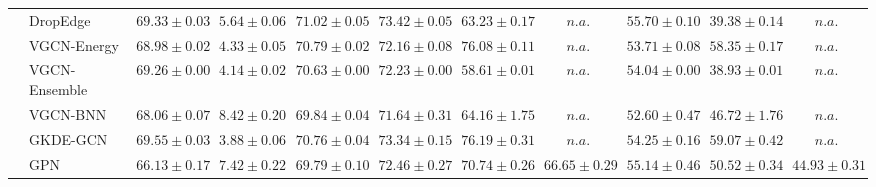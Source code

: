 \begin{table*}[!h]
{\begin{tabular}{ll|cc|cccc|ccc}
        & DropEdge & ${69.33\scriptscriptstyle \pm 0.03}$ & ${5.64\scriptscriptstyle \pm 0.06}$ & ${71.02\scriptscriptstyle \pm 0.05}$ & ${73.42\scriptscriptstyle \pm 0.05}$ & ${63.23\scriptscriptstyle \pm 0.17}$ & $n.a.$ & ${55.70\scriptscriptstyle \pm 0.10}$ & ${39.38\scriptscriptstyle \pm 0.14}$ & $n.a.$\\
        & VGCN-Energy & ${68.98\scriptscriptstyle \pm 0.02}$ & ${4.33\scriptscriptstyle \pm 0.05}$ & ${70.79\scriptscriptstyle \pm 0.02}$ & ${72.16\scriptscriptstyle \pm 0.08}$ & ${76.08\scriptscriptstyle \pm 0.11}$ & $n.a.$ & ${53.71\scriptscriptstyle \pm 0.08}$ & ${58.35\scriptscriptstyle \pm 0.17}$ & $n.a.$\\
        & VGCN-Ensemble & ${69.26\scriptscriptstyle \pm 0.00}$ & ${4.14\scriptscriptstyle \pm 0.02}$ & ${70.63\scriptscriptstyle \pm 0.00}$ & ${72.23\scriptscriptstyle \pm 0.00}$ & ${58.61\scriptscriptstyle \pm 0.01}$ & $n.a.$ & ${54.04\scriptscriptstyle \pm 0.00}$ & ${38.93\scriptscriptstyle \pm 0.01}$ & $n.a.$\\
        & VGCN-BNN & ${68.06\scriptscriptstyle \pm 0.07}$ & ${8.42\scriptscriptstyle \pm 0.20}$ & ${69.84\scriptscriptstyle \pm 0.04}$ & ${71.64\scriptscriptstyle \pm 0.31}$ & ${64.16\scriptscriptstyle \pm 1.75}$ & $n.a.$ & ${52.60\scriptscriptstyle \pm 0.47}$ & ${46.72\scriptscriptstyle \pm 1.76}$ & $n.a.$\\
        & GKDE-GCN & ${69.55\scriptscriptstyle \pm 0.03}$ & ${\mathbf{3.88}\scriptscriptstyle \pm 0.06}$ & ${70.76\scriptscriptstyle \pm 0.04}$ & ${73.34\scriptscriptstyle \pm 0.15}$ & ${\mathbf{76.19}\scriptscriptstyle \pm 0.31}$ & $n.a.$ & ${54.25\scriptscriptstyle \pm 0.16}$ & ${59.07\scriptscriptstyle \pm 0.42}$ & $n.a.$\\
        & GPN & ${66.13\scriptscriptstyle \pm 0.17}$ & ${7.42\scriptscriptstyle \pm 0.22}$ & ${69.79\scriptscriptstyle \pm 0.10}$ & ${72.46\scriptscriptstyle \pm 0.27}$ & ${70.74\scriptscriptstyle \pm 0.26}$ & ${{66.65}\scriptscriptstyle \pm 0.29}$ & ${55.14\scriptscriptstyle \pm 0.46}$ & ${50.52\scriptscriptstyle \pm 0.34}$ & ${{44.93}\scriptscriptstyle \pm 0.31}$\\


\end{tabular}}
\end{table*}
